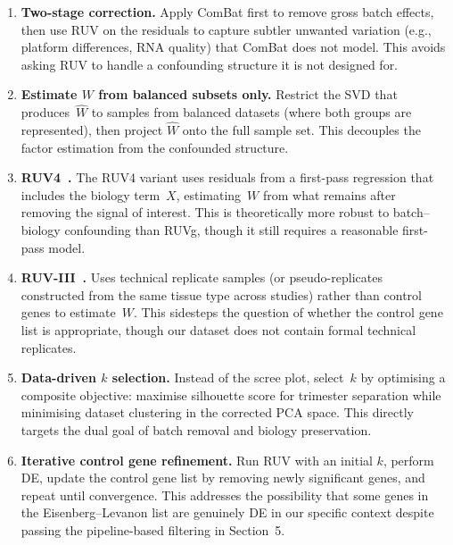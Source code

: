 \documentclass[11pt,a4paper]{article}
\begin{document}
\begin{enumerate}
  \item \textbf{Two-stage correction.}  Apply ComBat first to remove
        gross batch effects, then use RUV on the residuals to capture
        subtler unwanted variation (e.g., platform differences,
        RNA quality) that ComBat does not model.  This avoids asking
        RUV to handle a confounding structure it is not designed for.

  \item \textbf{Estimate $W$ from balanced subsets only.}  Restrict
        the SVD that produces~$\hat{W}$ to samples from balanced
        datasets (where both groups are represented), then project
        $\hat{W}$ onto the full sample set.  This decouples the
        factor estimation from the confounded structure.

  \item \textbf{RUV4~\cite{gagnonbartsch2013}.}  The RUV4 variant
        uses residuals from a first-pass regression that includes the
        biology term~$X$, estimating~$W$ from what remains after
        removing the signal of interest.  This is theoretically more
        robust to batch--biology confounding than RUVg, though it
        still requires a reasonable first-pass model.

  \item \textbf{RUV-III~\cite{molania2023}.}  Uses technical
        replicate samples (or pseudo-replicates constructed from the
        same tissue type across studies) rather than control genes to
        estimate~$W$.  This sidesteps the question of whether the
        control gene list is appropriate, though our dataset does not
        contain formal technical replicates.

  \item \textbf{Data-driven $k$ selection.}  Instead of the scree
        plot, select~$k$ by optimising a composite objective: maximise
        silhouette score for trimester separation while minimising
        dataset clustering in the corrected PCA space.  This directly
        targets the dual goal of batch removal and biology preservation.

  \item \textbf{Iterative control gene refinement.}  Run RUV with an
        initial $k$, perform DE, update the control gene list by
        removing newly significant genes, and repeat until
        convergence.  This addresses the possibility that some genes
        in the Eisenberg--Levanon list are genuinely DE in our
        specific context despite passing the pipeline-based filtering
        in Section~5.
\end{enumerate}
\end{document}
